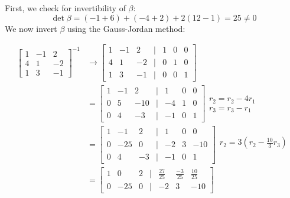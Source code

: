 \documentclass[12pt]{article}
\begin{document}
\begin{enumerate}
        First, we check for invertibility of $\beta$:
        \[ \det \beta = (-1+6)+(-4+2) +2(12-1) = 25 \neq 0\]
        We now invert $\beta$ using the Gauss-Jordan method:
        
        \begin{align*}
            \begin{bmatrix}
                1&-1&2 \\ 4&1&-2 \\ 1&3&-1
                \end{bmatrix}^{-1} 
            &\to \begin{bmatrix}
                    1&-1&2 &|& 1&0&0 
                    \\ 4&1&-2  &|& 0&1&0
                    \\ 1&3&-1 &|& 0&0&1
                \end{bmatrix}
            \\ &= \begin{bmatrix}
                    1&-1&2 &|& 1&0&0 
                    \\ 0&5&-10 &|& -4&1&0
                    \\ 0&4&-3 &|& -1&0&1
                \end{bmatrix}\begin{matrix}
                    \\ r_2 = r_2 - 4r_1
                    \\ r_3=r_3-r_1
                    \\ 
                \end{matrix}
            \\ &= \begin{bmatrix}
                    1&-1&2 &|& 1&0&0 
                    \\ 0&-25&0 &|& -2&3&-10
                    \\ 0&4&-3 &|& -1&0&1
                \end{bmatrix}\begin{matrix}
                    \\ r_2 = 3\left(r_2 - \frac{10}{3}r_3\right)
                    \\ %
                    \\ 
                \end{matrix}
            \\ &= \begin{bmatrix}
                    1&0&2 &|& \frac{27}{25}& \frac{-3}{25}&\frac{10}{25} 
                    \\ 0&-25&0 &|& -2&3&-10

\end{bmatrix}
\end{align*}
\end{enumerate}
\end{document}
